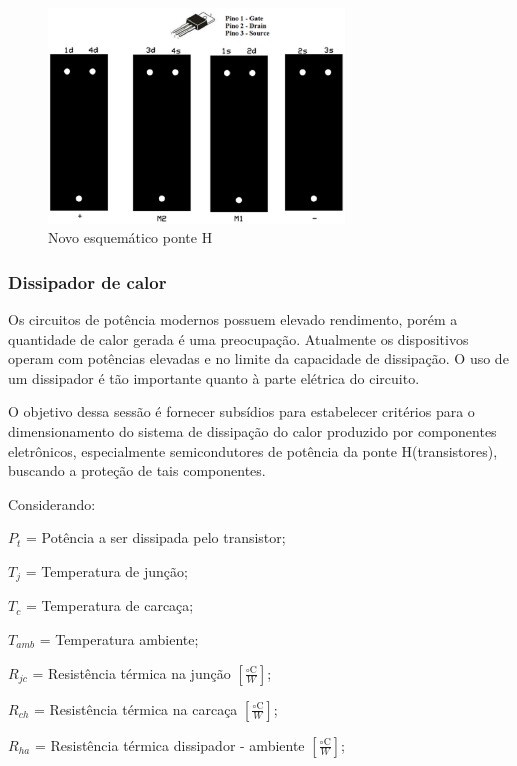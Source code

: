 			\begin{figure}[!ht]
				\center
				\includegraphics[width=0.7\textwidth]{figuras/resultados/novo_esquematico_ponte_h}
				\caption{Novo esquemático ponte H}
				\label{fig:novo_esquematico_ponte_h}
			\end{figure}

		\subsubsection{Dissipador de calor}

				Os circuitos de potência modernos possuem elevado rendimento, porém a quantidade de calor gerada é uma preocupação. Atualmente os dispositivos operam com potências elevadas e no limite da capacidade de dissipação. O uso de um dissipador é tão importante quanto à parte elétrica do circuito.

				O objetivo dessa sessão é fornecer subsídios para estabelecer critérios para o dimensionamento do sistema de dissipação do calor produzido por componentes eletrônicos, especialmente semicondutores de potência da ponte H(transistores), buscando a proteção de tais componentes.

				Considerando:

				$P_t$ = Potência a ser dissipada pelo transistor;

				$T_j$ = Temperatura de junção;

				$T_c$ = Temperatura de carcaça;

				$T_{amb}$ = Temperatura ambiente;

				$R_{jc}$ = Resistência térmica na junção $[\frac{{\circ}\mathrm{C}}{W}]$;

				$R_{ch}$ = Resistência térmica na carcaça $[\frac{{\circ}\mathrm{C}}{W}]$;

				$R_{ha}$ = Resistência térmica dissipador - ambiente $[\frac{{\circ}\mathrm{C}}{W}]$;

